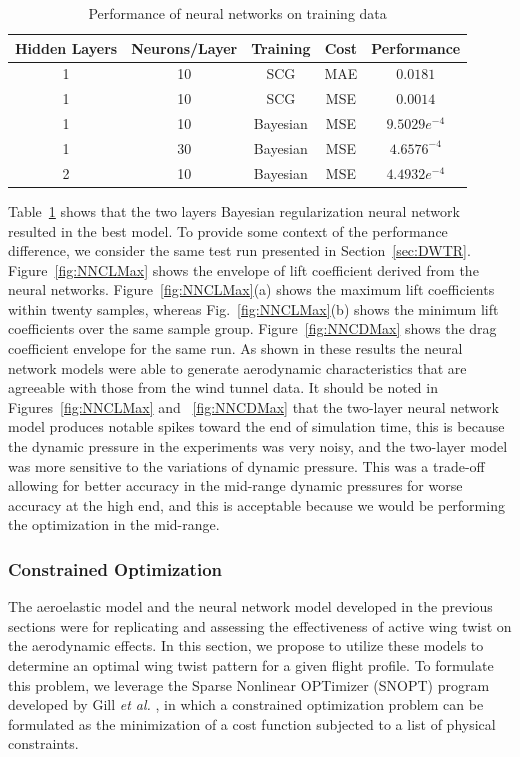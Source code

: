 \documentclass[11pt]{ucthesis}
\begin{document}
\begin{table}[h]
\caption{Performance of neural networks on training data}
\label{tab:error}
\begin{center}
\begin{tabular}{|c||c||c||c||c|}
\hline
Hidden Layers&Neurons/Layer&Training&Cost&Performance\\
\hline
1 & 10&SCG&MAE&$0.0181$\\
\hline
1 & 10&SCG&MSE&$0.0014$\\
\hline
1 & 10&Bayesian&MSE&$9.5029e^{-4}$\\
\hline
1 & 30&Bayesian&MSE&$4.6576^{-4}$\\
\hline
2& 10&Bayesian&MSE&$4.4932e^{-4}$\\
\hline
\end{tabular}
\end{center}
\end{table}
Table~\ref{tab:error} shows that the two layers Bayesian regularization neural network resulted in the best model. To provide some context of the performance difference, we consider the same test run presented in Section~\ref{sec:DWTR}. Figure~\ref{fig:NNCLMax} shows the envelope of lift coefficient derived from the neural networks. Figure~\ref{fig:NNCLMax}(a) shows the maximum lift coefficients within twenty samples, whereas Fig.~\ref{fig:NNCLMax}(b) shows the minimum lift coefficients over the same sample group. Figure~\ref{fig:NNCDMax} shows the drag coefficient envelope for the same run. As shown in these results the neural network models were able to generate aerodynamic characteristics that are agreeable with those from the wind tunnel data. It should be noted in Figures~\ref{fig:NNCLMax} and ~\ref{fig:NNCDMax} that the two-layer neural network model produces notable spikes toward the end of simulation time, this is because the dynamic pressure in the experiments was very noisy, and the two-layer model was more sensitive to the variations of dynamic pressure. This was a trade-off allowing for better accuracy in the mid-range dynamic pressures for worse accuracy at the high end, and this is acceptable because we would be performing the optimization in the mid-range. 

\subsubsection{Constrained Optimization}
\label{sec:Copt}
The aeroelastic model and the neural network model developed in the previous sections were for replicating and assessing the effectiveness of active wing twist on the aerodynamic effects. In this section, we propose to utilize these models to determine an optimal wing twist pattern for a given flight profile. To formulate this problem, we leverage the Sparse Nonlinear OPTimizer (SNOPT) program developed by Gill {\it et al.} \cite{gill2005snopt}, in which a constrained optimization problem can be formulated as the minimization of a cost function subjected to a list of physical constraints.     
\end{document}
